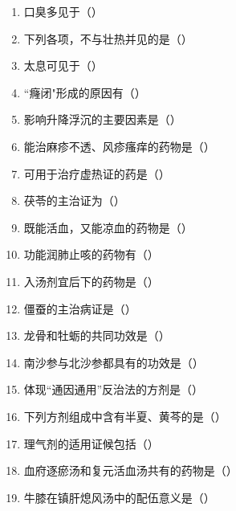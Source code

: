 \documentclass[a4paper,11pt]{ctexart}
\begin{document}
\begin{enumerate}[resume]
      \item 口臭多见于（\quad）
      \item 下列各项，不与壮热并见的是（\quad）
      \item 太息可见于（\quad）
      \item “癃闭"形成的原因有（\quad）
      \item 影响升降浮沉的主要因素是（\quad）
      \item 能治麻疹不透、风疹瘙痒的药物是（\quad）
      \item 可用于治疗虚热证的药是（\quad）
      \item 茯苓的主治证为（\quad）
      \item 既能活血，又能凉血的药物是（\quad）
      \item 功能润肺止咳的药物有（\quad）
      \item 入汤剂宜后下的药物是（\quad）
      \item 僵蚕的主治病证是（\quad）
      \item 龙骨和牡蛎的共同功效是（\quad）
      \item 南沙参与北沙参都具有的功效是（\quad）
      \item 体现“通因通用”反治法的方剂是（\quad）
      \item 下列方剂组成中含有半夏、黄芩的是（\quad）
      \item 理气剂的适用证候包括（\quad）
      \item 血府逐瘀汤和复元活血汤共有的药物是（\quad）
      \item 牛膝在镇肝熄风汤中的配伍意义是（\quad）

\end{enumerate}
\end{document}
